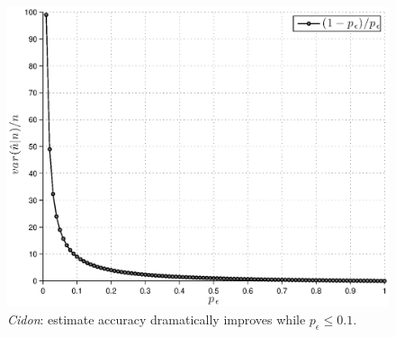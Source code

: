 \documentclass[12pt,a4paper]{report}
\newcommand{\pc}{p_{\epsilon}}
\begin{document}
\begin{figure}[htbp]
\begin{center}
\includegraphics[scale=0.7]{matlab/Cidon/cidon-variance-p}
\caption[\emph{Cidon}: Variance behavior]{\emph{Cidon}:  estimate accuracy dramatically improves while $\pc\leq0.1$.}
\end{center}
\end{figure}
\end{document}
